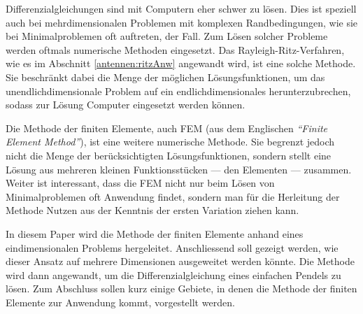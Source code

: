 %
%
%
%



Differenzialgleichungen sind mit Computern eher schwer zu lösen. 
Dies ist speziell auch bei mehrdimensionalen Problemen mit komplexen Randbedingungen, wie sie bei Minimalproblemen oft auftreten, der Fall. 
Zum Lösen solcher Probleme werden oftmals numerische Methoden eingesetzt. 
Das Rayleigh-Ritz-Verfahren, wie es im Abschnitt \ref{antennen:ritzAnw} angewandt wird, ist eine solche Methode.
Sie beschränkt dabei die Menge der möglichen Lösungsfunktionen, um das unendlichdimensionale Problem auf ein endlichdimensionales herunterzubrechen, sodass zur Lösung Computer eingesetzt werden können. 

Die Methode der finiten Elemente, auch FEM (aus dem Englischen {\em ``Finite Element Method''}), ist eine weitere numerische Methode.
Sie begrenzt jedoch nicht die Menge der berücksichtigten Lösungsfunktionen, sondern stellt eine Lösung aus mehreren kleinen Funktionsstücken --- den Elementen --- zusammen.
Weiter ist interessant, dass die FEM nicht nur beim Lösen von Minimalproblemen oft Anwendung findet, sondern man für die Herleitung der Methode Nutzen aus der Kenntnis der ersten Variation ziehen kann. 

In diesem Paper wird die Methode der finiten Elemente anhand eines eindimensionalen Problems hergeleitet. 
Anschliessend soll gezeigt werden, wie dieser Ansatz auf mehrere Dimensionen ausgeweitet werden könnte. 
Die Methode wird dann angewandt, um die Differenzialgleichung eines einfachen Pendels zu lösen. 
Zum Abschluss sollen kurz einige Gebiete, in denen die Methode der finiten Elemente zur Anwendung kommt, vorgestellt werden.
